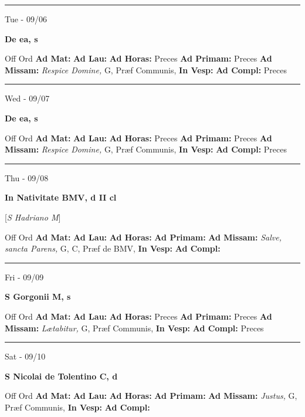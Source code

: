 \documentclass[letterpaper, 10pt]{article}
\begin{document}
\hrule
\begin{center}
Tue - 09/06
\end{center}\textbf{ \large De ea, \textnormal{\normalsize s}}
\begin{justify}
Off Ord
\textbf{Ad Mat: }
\textbf{Ad Lau: }
\textbf{Ad Horas: }Preces
\textbf{Ad Primam: }Preces
\textbf{Ad Missam:} \textit{Respice Domine, } G, Præf Communis, 
\textbf{In Vesp: }
\textbf{Ad Compl: }Preces\end{justify}



\hrule
\begin{center}
Wed - 09/07
\end{center}\textbf{ \large De ea, \textnormal{\normalsize s}}
\begin{justify}
Off Ord
\textbf{Ad Mat: }
\textbf{Ad Lau: }
\textbf{Ad Horas: }Preces
\textbf{Ad Primam: }Preces
\textbf{Ad Missam:} \textit{Respice Domine, } G, Præf Communis, 
\textbf{In Vesp: }
\textbf{Ad Compl: }Preces\end{justify}



\hrule
\begin{center}
Thu - 09/08
\end{center}\textbf{ \large In Nativitate BMV, \textnormal{\normalsize d II cl}}

[\textit{S Hadriano M}]
\begin{justify}
Off Ord
\textbf{Ad Mat: }
\textbf{Ad Lau: }
\textbf{Ad Horas: }
\textbf{Ad Primam: }
\textbf{Ad Missam:} \textit{Salve, sancta Parens, } G, C, Præf de BMV, 
\textbf{In Vesp: }
\textbf{Ad Compl: }\end{justify}



\hrule
\begin{center}
Fri - 09/09
\end{center}\textbf{ \large S Gorgonii M, \textnormal{\normalsize s}}
\begin{justify}
Off Ord
\textbf{Ad Mat: }
\textbf{Ad Lau: }
\textbf{Ad Horas: }Preces
\textbf{Ad Primam: }Preces
\textbf{Ad Missam:} \textit{Lætabitur, } G, Præf Communis, 
\textbf{In Vesp: }
\textbf{Ad Compl: }Preces\end{justify}



\hrule
\begin{center}
Sat - 09/10
\end{center}\textbf{ \large S Nicolai de Tolentino C, \textnormal{\normalsize d}}
\begin{justify}
Off Ord
\textbf{Ad Mat: }
\textbf{Ad Lau: }
\textbf{Ad Horas: }
\textbf{Ad Primam: }
\textbf{Ad Missam:} \textit{Justus, } G, Præf Communis, 
\textbf{In Vesp: }
\textbf{Ad Compl: }\end{justify}
\end{document}
